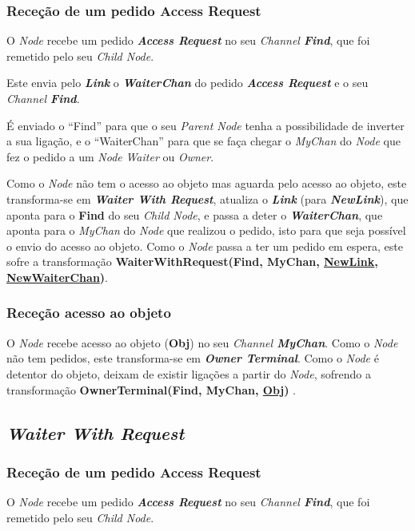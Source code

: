 \subsubsection*{Receção de um pedido Access Request}
O \emph{Node} recebe um pedido \emph{\textbf{Access Request}} no seu \emph{Channel \textbf{Find}}, que foi remetido pelo seu \emph{Child Node}.

Este envia pelo \textbf{\emph{Link}} o \textbf{\emph{WaiterChan}} do pedido \emph{\textbf{Access Request}} e o seu \emph{Channel \textbf{Find}}.

É enviado o ``Find'' para que o seu \emph{Parent Node} tenha a possibilidade de inverter a sua ligação, 
e o ``WaiterChan'' para que se faça chegar o \emph{MyChan} do \emph{Node} que fez o pedido a um \emph{Node} \emph{Waiter} ou \emph{Owner}.


Como o \emph{Node} não tem o acesso ao objeto mas aguarda pelo acesso ao objeto, este transforma-se em \emph{\textbf{Waiter With Request}}, atualiza o \textbf{\emph{Link}} (para \textbf{\emph{NewLink}}),
que aponta para o \textbf{Find} do seu \emph{Child Node}, 
e passa a deter o \textbf{\emph{WaiterChan}}, que aponta para o \emph{MyChan} do \emph{Node} que realizou o pedido, isto para que seja possível o envio do acesso ao objeto.
Como o \emph{Node} passa a ter um pedido em espera, este sofre a transformação \textbf{WaiterWithRequest(Find, MyChan, \underline{NewLink}, \underline{NewWaiterChan})}.


\subsubsection*{Receção acesso ao objeto}
O \emph{Node} recebe acesso ao objeto (\textbf{Obj}) no seu \emph{Channel \textbf{MyChan}}.
Como o \emph{Node} não tem pedidos, este transforma-se em \textbf{\emph{Owner Terminal}}.
Como o \emph{Node} é detentor do objeto, deixam de existir ligações a partir do \emph{Node}, sofrendo a transformação \textbf{ OwnerTerminal(Find, MyChan, \underline{Obj}) }.



\subsection*{\emph{Waiter With Request}}
\label{especificacao:nodes:waiter_with_request}


\subsubsection*{Receção de um pedido Access Request}
O \emph{Node} recebe um pedido \emph{\textbf{Access Request}} no seu \emph{Channel \textbf{Find}}, que foi remetido pelo seu \emph{Child Node}.

